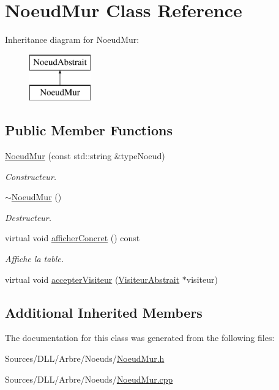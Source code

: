\hypertarget{class_noeud_mur}{}\section{Noeud\+Mur Class Reference}
\label{class_noeud_mur}
Inheritance diagram for Noeud\+Mur\+:\begin{figure}[H]
\begin{center}
\leavevmode
\includegraphics[height=2.000000cm]{class_noeud_mur}
\end{center}
\end{figure}
\subsection*{Public Member Functions}
\begin{DoxyCompactItemize}
\item 
\hyperlink{group__inf2990_gaeab2deec90548c0bdca5eb86beb629cf}{Noeud\+Mur} (const std\+::string \&type\+Noeud)
\begin{DoxyCompactList}\small\item\em Constructeur. \end{DoxyCompactList}\item 
\hyperlink{group__inf2990_ga169060e04a6423e7f025d475afd7d9ea}{$\sim$\+Noeud\+Mur} ()
\begin{DoxyCompactList}\small\item\em Destructeur. \end{DoxyCompactList}\item 
virtual void \hyperlink{group__inf2990_ga521a3062875ea6ed1645485412a70c7b}{afficher\+Concret} () const 
\begin{DoxyCompactList}\small\item\em Affiche la table. \end{DoxyCompactList}\item 
virtual void \hyperlink{group__inf2990_ga91ea1a5930052142e26a359fd5bf9828}{accepter\+Visiteur} (\hyperlink{class_visiteur_abstrait}{Visiteur\+Abstrait} $\ast$visiteur)
\end{DoxyCompactItemize}
\subsection*{Additional Inherited Members}


The documentation for this class was generated from the following files\+:\begin{DoxyCompactItemize}
\item 
Sources/\+D\+L\+L/\+Arbre/\+Noeuds/\hyperlink{_noeud_mur_8h}{Noeud\+Mur.\+h}\item 
Sources/\+D\+L\+L/\+Arbre/\+Noeuds/\hyperlink{_noeud_mur_8cpp}{Noeud\+Mur.\+cpp}\end{DoxyCompactItemize}
